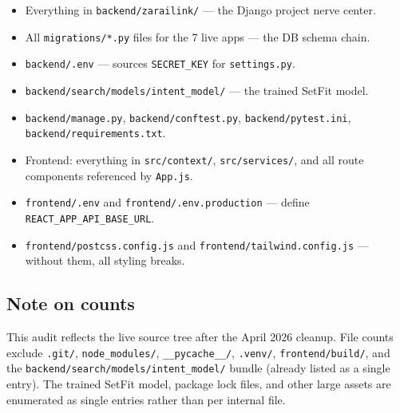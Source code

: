 \documentclass[10pt,a4paper]{article}
\begin{document}
\begin{itemize}[leftmargin=1.2cm]
  \item Everything in \texttt{backend/zarailink/} --- the Django project nerve center.
  \item All \texttt{migrations/*.py} files for the 7 live apps --- the DB schema chain.
  \item \texttt{backend/.env} --- sources \texttt{SECRET\_KEY} for \texttt{settings.py}.
  \item \texttt{backend/search/models/intent\_model/} --- the trained SetFit model.
  \item \texttt{backend/manage.py}, \texttt{backend/conftest.py}, \texttt{backend/pytest.ini}, \texttt{backend/requirements.txt}.
  \item Frontend: everything in \texttt{src/context/}, \texttt{src/services/}, and all route components referenced by \texttt{App.js}.
  \item \texttt{frontend/.env} and \texttt{frontend/.env.production} --- define \texttt{REACT\_APP\_API\_BASE\_URL}.
  \item \texttt{frontend/postcss.config.js} and \texttt{frontend/tailwind.config.js} --- without them, all styling breaks.
\end{itemize}

\subsection{Note on counts}

This audit reflects the live source tree after the April 2026 cleanup.
File counts exclude \texttt{.git/}, \texttt{node\_modules/},
\texttt{\_\_pycache\_\_/}, \texttt{.venv/}, \texttt{frontend/build/}, and the
\texttt{backend/search/models/intent\_model/} bundle (already listed
as a single entry). The trained SetFit model, package lock files, and
other large assets are enumerated as single entries rather than per
internal file.
\end{document}
